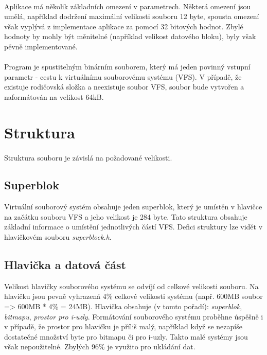 \documentclass[12pt, a4paper]{article}
\begin{document}
\paragraph{}
Aplikace má několik základních omezení v parametrech. Některá omezení jsou umělá, například dodržení maximální velikosti souboru 12 byte, spousta omezení však vyplývá z implementace aplikace za pomocí 32 bitových hodnot. Zbylé hodnoty by mohly být měnitelné (například velikost datového bloku), byly však pěvně implementované. 

\paragraph{}
Program je spustitelným binárním souborem, který má jeden povinný vstupní parametr - cestu k virtuálnímu souborovému systému (VFS). V případě, že existuje rodičovská složka a neexistuje soubor VFS, soubor bude vytvořen a naformátován na velikost 64kB.

\paragraph{}

\newpage
\section{Struktura}
\paragraph{}
Struktura souboru je závislá na požadované velikosti.

\subsection{Superblok}
Virtuální souborový systém obsahuje jeden superblok, který je umístěn v hlavičce na začátku souboru VFS a jeho velikost je 284 byte. Tato struktura obsahuje základní informace o umístění jednotlivých částí VFS. Defici struktury lze vidět v hlavičkovém souboru \textit{superblock.h}.

\subsection{Hlavička a datová část}
Velikost hlavičky souborového systému se odvíjí od celkové velikosti souboru. Na hlavičku jsou pevně vyhrazená 4\% celkové velikosti systému (např. 600MB soubor => 600MB * 4\% = 24MB). Hlavička obsahuje (v tomto pořadí): \textit{superblok}, \textit{bitmapu}, \textit{prostor pro i-uzly}. Formátování souborového systému proběhne úspěšně i v případě, že prostor pro hlavičku je příliš malý, například když se nezapíše dostatečné množství byte pro bitmapu či pro i-uzly. Takto malé systémy jsou však nepoužitelné. Zbylých 96\% je využito pro ukládání dat. 
\end{document}
